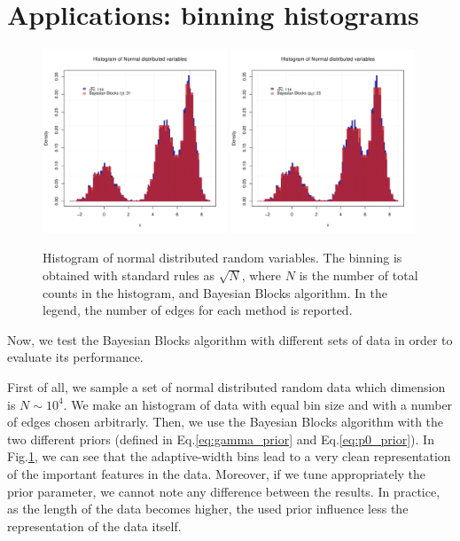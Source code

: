 \documentclass[prb,twocolumn]{revtex4-1}
\begin{document}
\section{Applications: binning histograms}

\begin{figure}[th!]
    \centering 
    \includegraphics[width=0.49\textwidth]{images/norm_gamma.pdf}
    \hskip 1mm
   \includegraphics[width=0.49\textwidth]{images/norm_p0.pdf}
    \caption{Histogram of normal distributed random variables. The binning is obtained with standard rules as $\sqrt{N}$, where $N$ is the number of total counts in the histogram, and Bayesian Blocks algorithm. In the legend, the number of edges for each method is reported.}
    \label{fig:norm_histograms}
\end{figure}


Now, we test the Bayesian Blocks algorithm with different sets of data in order to evaluate its performance.

First of all, we sample a set of normal distributed random data which dimension is $N \sim 10^{4}$. We make an histogram of data with equal bin size and with a number of edges chosen arbitrarly. Then, we use the Bayesian Blocks algorithm with the two different priors (defined in Eq.\ref{eq:gamma_prior} and Eq.\ref{eq:p0_prior}).
In Fig.\ref{fig:norm_histograms}, we can see that the adaptive-width bins lead to a very clean representation of the important features in the data. Moreover, if we tune appropriately the prior parameter, we cannot note any difference between the results. In practice, as the length of the data becomes higher, the used prior influence less the representation of the data itself. 
\end{document}

